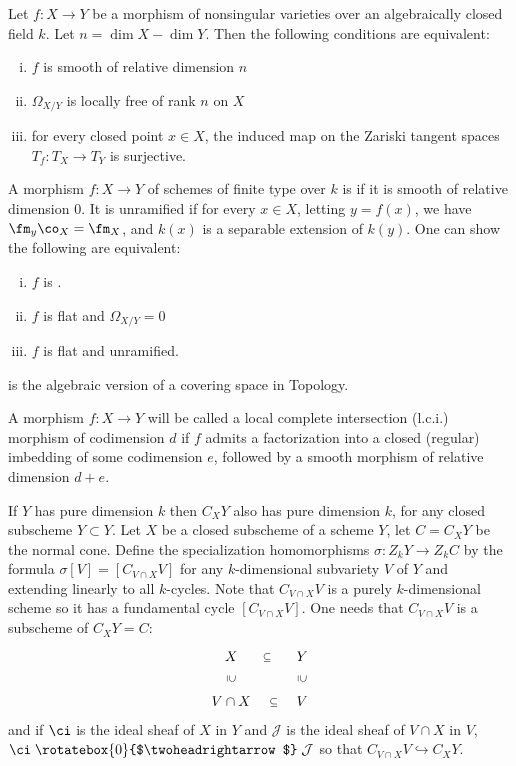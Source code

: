 \begin{prop}
Let $f: X \to Y$ be a morphism of nonsingular varieties over an algebraically closed field $k$. Let $n=\dim X - \dim Y$. Then the following conditions are equivalent:
\begin{enumerate}[(i)]
\item $f$ is smooth of relative dimension $n$
\item $\Omega_{X/Y}$ is locally free of rank $n$ on $X$
\item for every closed point $x \in X$, the induced map on the Zariski tangent spaces $T_f: T_X \to T_Y$ is surjective.
\end{enumerate}
\end{prop}

\begin{dfn}[\'{E}tale]
A morphism $f: X \to Y$ of schemes of finite type over $k$ is \et if it is smooth of relative dimension 0. It is unramified if for every $x \in X$, letting $y=f(x)$, we have $\fm_y \co_X=\fm_X$, and $k(x)$ is a separable extension of $k(y)$. One can show the following are equivalent:
\begin{enumerate}[(i)]
\item $f$ is \et.
\item $f$ is flat and $\Omega_{X/Y}=0$
\item $f$ is flat and unramified.
\end{enumerate}
\end{dfn}

\Et is the algebraic version of a covering space in Topology. 

\begin{dfn}
A morphism $f: X \to Y$ will be called a local complete intersection (l.c.i.) morphism of codimension $d$ if $f$ admits a factorization into a closed (regular) imbedding of some codimension $e$, followed by a smooth morphism of relative dimension $d+e$.
\end{dfn}

If $Y$ has pure dimension $k$ then $C_X Y$ also has pure dimension $k$, for any closed subscheme $Y \subset Y$. Let $X$ be a closed subscheme of a scheme $Y$, let $C=C_X Y$ be the normal cone. Define the specialization homomorphisms $\sigma: Z_k Y \to Z_kC$ by the formula $\sigma[V]=[C_{V \cap X} V]$ for any $k$-dimensional subvariety $V$ of $Y$ and extending linearly to all $k$-cycles. Note that $C_{V \cap X} V$ is a purely $k$-dimensional scheme so it has a fundamental cycle $[C_{V \cap X}V]$. One needs that $C_{V \cap X}V$ is a subscheme of $C_X Y=C$:
	\[
	\begin{tikzcd}
	X \arrow[draw=none]{r}[sloped,auto=false]{\subseteq} \arrow[draw=none]{d}[sloped,auto=false]{\supseteq} & Y \arrow[draw=none]{d}[sloped,auto=false]{\supseteq} \\
	V \cap X \arrow[draw=none]{r}[sloped,auto=false]{\subseteq} & V
	\end{tikzcd}
	\]	
and if $\ci$ is the ideal sheaf of $X$ in $Y$ and $\mathcal{J}$ is the ideal sheaf of $V\cap X$ in $V$, $\ci \mathrel{\rotatebox{0}{$\twoheadrightarrow$}} \mathcal{J}$ so that $C_{V \cap X} V \hookrightarrow C_X Y$.

